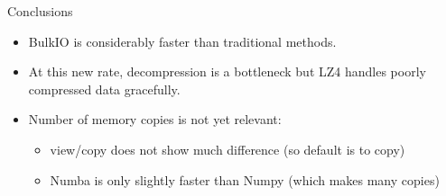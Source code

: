 \documentclass{beamer}
\begin{document}
\begin{frame}{Conclusions}
\large
\begin{itemize}
\item BulkIO is considerably faster than traditional methods.
\item At this new rate, decompression is a bottleneck but LZ4 handles poorly compressed data gracefully.
\item Number of memory copies is not yet relevant:
\begin{itemize}
\item view/copy does not show much difference (so default is to copy)
\item Numba is only slightly faster than Numpy (which makes many copies)
\end{itemize}


\end{itemize}
\end{frame}
\end{document}
